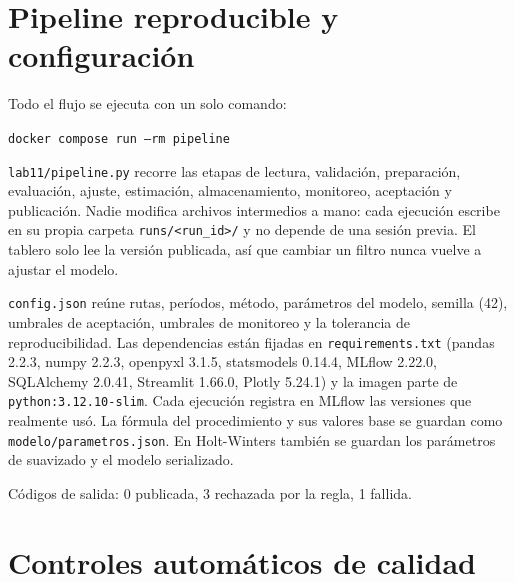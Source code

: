 \documentclass[11pt,letterpaper]{article}
\begin{document}
\section{Pipeline reproducible y configuración}

Todo el flujo se ejecuta con un solo comando:

\begin{center}\texttt{docker compose run --rm pipeline}\end{center}

\texttt{lab11/pipeline.py} recorre las etapas de lectura, validación, preparación, evaluación, ajuste, estimación, almacenamiento, monitoreo, aceptación y publicación. Nadie modifica archivos intermedios a mano: cada ejecución escribe en su propia carpeta \texttt{runs/<run\_id>/} y no depende de una sesión previa. El tablero solo lee la versión publicada, así que cambiar un filtro nunca vuelve a ajustar el modelo.

\texttt{config.json} reúne rutas, períodos, método, parámetros del modelo, semilla (42), umbrales de aceptación, umbrales de monitoreo y la tolerancia de reproducibilidad. Las dependencias están fijadas en \texttt{requirements.txt} (pandas 2.2.3, numpy 2.2.3, openpyxl 3.1.5, statsmodels 0.14.4, MLflow 2.22.0, SQLAlchemy 2.0.41, Streamlit 1.66.0, Plotly 5.24.1) y la imagen parte de \texttt{python:3.12.10-slim}. Cada ejecución registra en MLflow las versiones que realmente usó. La fórmula del procedimiento y sus valores base se guardan como \texttt{modelo/parametros.json}. En Holt-Winters también se guardan los parámetros de suavizado y el modelo serializado.

Códigos de salida: 0 publicada, 3 rechazada por la regla, 1 fallida.

\section{Controles automáticos de calidad}\label{sec:controles}
\end{document}
